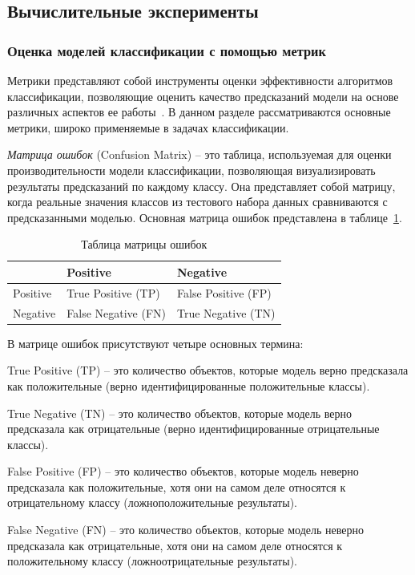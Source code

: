\subsection{Вычислительные эксперименты}

\subsubsection*{Оценка моделей классификации с помощью метрик}

Метрики представляют собой инструменты оценки эффективности алгоритмов классификации, позволяющие оценить качество предсказаний модели на основе различных аспектов ее работы~\cite{manning2008introduction}. В данном разделе рассматриваются основные метрики, широко применяемые в задачах классификации.

\textit{Матрица ошибок} (Confusion Matrix) -- это таблица, используемая для оценки производительности модели классификации, позволяющая визуализировать результаты предсказаний по каждому классу. Она представляет собой матрицу, когда реальные значения классов из тестового набора данных сравниваются с предсказанными моделью. Основная матрица ошибок представлена в таблице~\ref{tabular:matrix}.

\begin{table}[h]
    \onehalfspacing \caption{Таблица матрицы ошибок}
    \fontsize{12pt}{1em}\selectfont
    \medskip
    \begin{tabularx}{\textwidth}{|X|X|X|} 
    \hline
        \backslashbox{}{}  & Positive & Negative \\ \hline
        Positive & True Positive (TP) & False Positive (FP)\\ \hline
        Negative & False Negative (FN) & True Negative (TN) \\ \hline
    \end{tabularx} 
    \label{tabular:matrix}
\end{table}
\vspace{1em}

В матрице ошибок присутствуют четыре основных термина: 

\begin{enumerateparendot}
    \item True Positive (TP) -- это количество объектов, которые модель верно предсказала как положительные (верно идентифицированные положительные классы).
    \item  True Negative (TN) -- это количество объектов, которые модель верно предсказала как отрицательные (верно идентифицированные отрицательные классы).
    \item  False Positive (FP) -- это количество объектов, которые модель неверно предсказала как положительные, хотя они на самом деле относятся к отрицательному классу (ложноположительные результаты).
    \item  False Negative (FN) -- это количество объектов, которые модель неверно предсказала как отрицательные, хотя они на самом деле относятся к положительному классу (ложноотрицательные результаты).
\end{enumerateparendot}

